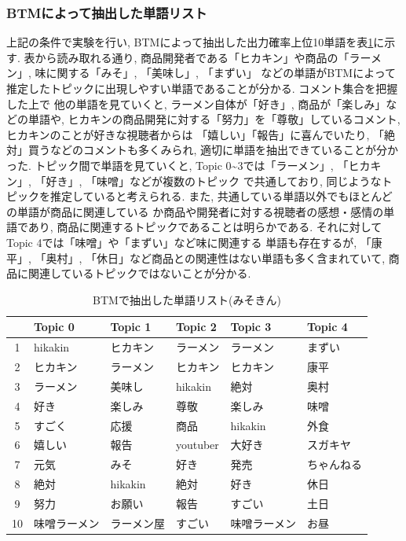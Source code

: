 \documentclass{ltjarticle}
\begin{document}
\newpage
\subsubsection{BTMによって抽出した単語リスト}
上記の条件で実験を行い, BTMによって抽出した出力確率上位10単語を表\ref{table:みそきん単語結果}に示す. 
表から読み取れる通り, 商品開発者である「ヒカキン」や商品の「ラーメン」, 味に関する「みそ」, 「美味し」, 「まずい」
などの単語がBTMによって推定したトピックに出現しやすい単語であることが分かる. コメント集合を把握した上で
他の単語を見ていくと, ラーメン自体が「好き」, 商品が「楽しみ」などの単語や, 
ヒカキンの商品開発に対する「努力」を「尊敬」しているコメント, ヒカキンのことが好きな視聴者からは
「嬉しい」「報告」に喜んでいたり, 「絶対」買うなどのコメントも多くみられ, 適切に単語を抽出できていることが分かった. 
トピック間で単語を見ていくと, Topic 0\sim 3では「ラーメン」, 「ヒカキン」, 「好き」, 「味噌」などが複数のトピック
で共通しており, 同じようなトピックを推定していると考えられる. また, 共通している単語以外でもほとんどの単語が商品に関連している
か商品や開発者に対する視聴者の感想・感情の単語であり, 商品に関連するトピックであることは明らかである. 
それに対してTopic 4では「味噌」や「まずい」など味に関連する
単語も存在するが, 「康平」, 「奥村」, 「休日」など商品との関連性はない単語も多く含まれていて, 
商品に関連しているトピックではないことが分かる. 
\vspace{10truept}

\begin{table}[h]
    \caption{BTMで抽出した単語リスト(みそきん)}
    \vspace{5truept}

    \centering
    \begin{tabular}{|c|>{\centering}p{6em}|>{\centering}p{6em}|>{\centering}p{6em}|>{\centering}p{6em}|>{\centering\arraybackslash}p{6em}|}
        \hline
        & Topic 0 & Topic 1 & Topic 2 & Topic 3 & Topic 4\\
        \hline\hline
        1 & hikakin & ヒカキン & ラーメン & ラーメン & まずい\\
        \hline
        2 & ヒカキン & ラーメン & ヒカキン & ヒカキン & 康平\\
        \hline
        3 & ラーメン & 美味し & hikakin & 絶対 & 奥村\\
        \hline
        4 & 好き & 楽しみ & 尊敬 & 楽しみ & 味噌\\
        \hline
        5 & すごく & 応援 & 商品 & hikakin & 外食\\
        \hline
        6 & 嬉しい & 報告 & youtuber & 大好き & スガキヤ\\
        \hline
        7 & 元気 & みそ & 好き & 発売 & ちゃんねる\\
        \hline
        8 & 絶対 & hikakin & 絶対 & 好き & 休日\\
        \hline
        9 & 努力 & お願い & 報告 & すごい & 土日\\
        \hline
        10 & 味噌ラーメン & ラーメン屋 & すごい & 味噌ラーメン & お昼\\
        \hline
    \end{tabular}
    \label{table:みそきん単語結果}
\end{table}
\vspace{15truept}
\end{document}
